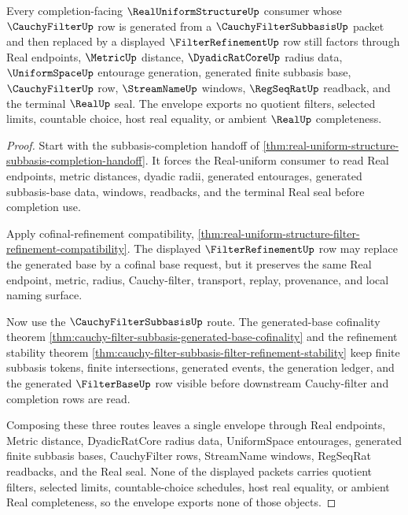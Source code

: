 \begin{theorem}
\label{thm:real-uniform-structure-subbasis-refinement-envelope}
Every completion-facing $\RealUniformStructureUp$ consumer whose $\CauchyFilterUp$ row is generated from a $\CauchyFilterSubbasisUp$ packet and then replaced by a displayed $\FilterRefinementUp$ row still factors through Real endpoints, $\MetricUp$ distance, $\DyadicRatCoreUp$ radius data, $\UniformSpaceUp$ entourage generation, generated finite subbasis base, $\CauchyFilterUp$ row, $\StreamNameUp$ windows, $\RegSeqRatUp$ readback, and the terminal $\RealUp$ seal. The envelope exports no quotient filters, selected limits, countable choice, host real equality, or ambient $\RealUp$ completeness.
\end{theorem}
\begin{proof}
Start with the subbasis-completion handoff of \autoref{thm:real-uniform-structure-subbasis-completion-handoff}. It forces the Real-uniform consumer to read Real endpoints, metric distances, dyadic radii, generated entourages, generated subbasis-base data, windows, readbacks, and the terminal Real seal before completion use.

Apply cofinal-refinement compatibility, \autoref{thm:real-uniform-structure-filter-refinement-compatibility}. The displayed $\FilterRefinementUp$ row may replace the generated base by a cofinal base request, but it preserves the same Real endpoint, metric, radius, Cauchy-filter, transport, replay, provenance, and local naming surface.

Now use the $\CauchyFilterSubbasisUp$ route. The generated-base cofinality theorem \autoref{thm:cauchy-filter-subbasis-generated-base-cofinality} and the refinement stability theorem \autoref{thm:cauchy-filter-subbasis-filter-refinement-stability} keep finite subbasis tokens, finite intersections, generated events, the generation ledger, and the generated $\FilterBaseUp$ row visible before downstream Cauchy-filter and completion rows are read.

Composing these three routes leaves a single envelope through Real endpoints, Metric distance, DyadicRatCore radius data, UniformSpace entourages, generated finite subbasis bases, CauchyFilter rows, StreamName windows, RegSeqRat readbacks, and the Real seal. None of the displayed packets carries quotient filters, selected limits, countable-choice schedules, host real equality, or ambient Real completeness, so the envelope exports none of those objects.
\end{proof}


